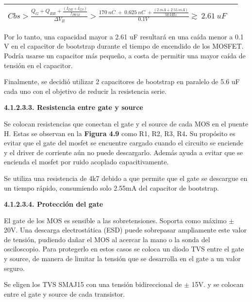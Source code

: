 \documentclass{article} %
\begin{document}
\noindent 

\begin{tabular}{|p{3.9in}|p{0.4in}|} \hline 
$Cbs>{{\frac{Q_G+Q_{RR}+\frac{(I_{DR}+I_{GS})}{f_{PWM}}}{{\mathit{\Delta}V}_B}}}>{\frac{170\ nC\ +\ 0.625\ nC\ +\frac{(2\ mA+2.55\ mA)}{50\ kHz}}{0.1V\ }}\gtrsim \ 2.61\ uF$ &  \\ \hline 
\end{tabular}

Por lo tanto, una capacidad mayor a 2.61 uF resultar\'{a} en una ca\'{i}da menor a 0.1 V en el capacitor de bootstrap durante el tiempo de encendido de los MOSFET. Podr\'{i}a usarse un capacitor m\'{a}s peque\~{n}o, a costa de permitir una mayor ca\'{i}da de tensi\'{o}n en el capacitor. 

\noindent 

\noindent Finalmente, se decidi\'{o} utilizar 2 capacitores de bootstrap en paralelo de 5.6 uF cada uno con el objetivo de reducir la resistencia serie.

\noindent 
{\bf 4.1.2.3.3. Resistencia entre gate y source}

\noindent Se colocan resistencias que conectan el gate y el source de cada MOS en el puente H. Estas se observan en la \textbf{Figura 4.9 }como R1, R2, R3, R4\textbf{.} Su prop\'{o}sito es evitar que el gate del mosfet se encuentre cargado cuando el circuito se enciende y el driver de corriente a\'{u}n no puede descargarlo. Adem\'{a}s ayuda a evitar que se encienda el mosfet por ruido acoplado capacitivamente. \textbf{}

\noindent 

\noindent Se utiliza una resistencia de 4k7 debido a que permite que el gate se descargue en un tiempo r\'{a}pido, consumiendo solo 2.55mA del capacitor de bootstrap.

\noindent 

\noindent 
{\bf 4.1.2.3.4. Protecci\'{o}n del gate}

\noindent El gate de los MOS es sensible a las sobretensiones. Soporta como m\'{a}ximo $\mathrm{\pm}$ 20V. Una descarga electrost\'{a}tica (ESD) puede sobrepasar ampliamente este valor de tensi\'{o}n, pudiendo da\~{n}ar el MOS al acercar la mano o la sonda del osciloscopio. Para protegerlo en estos casos se coloca un diodo TVS entre el gate y source, de manera de limitar la tensi\'{o}n que se desarrolla en el gate a un valor seguro.

\noindent 

\noindent Se eligen los TVS SMAJ15 con una tensi\'{o}n bidireccional de $\mathrm{\pm}$ 15V. y se colocan entre el gate y source de cada transistor.
\end{document}
